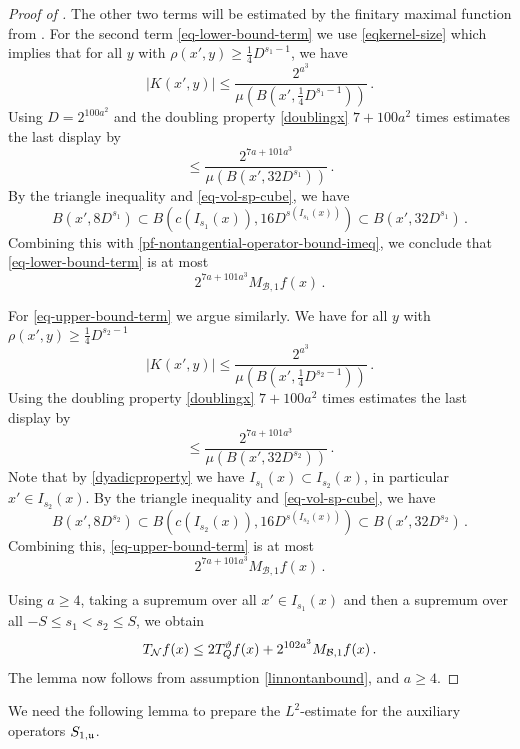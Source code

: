 \begin{proof}[Proof of ]
    The other two terms will be estimated by the finitary maximal function from .
    For the second term \eqref{eq-lower-bound-term} we use \eqref{eqkernel-size} which implies that for all $y$ with $\rho(x', y) \ge \frac{1}{4}D^{s_1 - 1}$, we have
    $$
        |K(x', y)| \le \frac{2^{a^3}}{\mu(B(x', \frac{1}{4}D^{s_1 - 1}))}\,.
    $$
    Using $D=2^{100a^2}$
    and the doubling property \eqref{doublingx} $7 +100a^2$ times estimates
    the last display by
    \begin{equation}
    \label{pf-nontangential-operator-bound-imeq}
        \le \frac{2^{7a+101a^3}}{\mu(B(x', 32D^{s_1}))}\, .
    \end{equation}
    By the triangle inequality and \eqref{eq-vol-sp-cube}, we have
    $$
        B(x', 8D^{s_1}) \subset B(c(I_{s_1}(x)), 16D^{s(I_{s_1}(x))}) \subset B(x', 32D^{s_1})\,.
    $$
    Combining this with \eqref{pf-nontangential-operator-bound-imeq}, we conclude that \eqref{eq-lower-bound-term} is at most
    $$
        2^{7a + 101a^3} M_{\mathcal{B},1} f(x)\,.
    $$

    For \eqref{eq-upper-bound-term} we argue similarly. We have for all $y$ with $\rho(x', y) \ge \frac{1}{4}D^{s_2-1}$
    $$
        |K(x', y)| \le \frac{2^{a^3}}{\mu(B(x', \frac{1}{4}D^{s_2-1}))}\,.
    $$
    Using the doubling property \eqref{doublingx} $7 + 100a^2$ times estimates
    the last display by
    \begin{equation}
        \le \frac{2^{7a + 101a^3}}{\mu(B(x', 32 D^{s_2}))}\, .
    \end{equation}
    Note that by \eqref{dyadicproperty} we have $I_{s_1}(x) \subset I_{s_2}(x)$, in particular $x' \in I_{s_2}(x)$.
    By the triangle inequality and \eqref{eq-vol-sp-cube}, we have
    $$
        B(x', 8D^{s_2}) \subset B(c(I_{s_2}(x)), 16D^{s(I_{s_2}(x))}) \subset B(x', 32D^{s_2})\,.
    $$
    Combining this, \eqref{eq-upper-bound-term} is at most
    $$
        2^{7a+101a^3} M_{\mathcal{B},1} f(x)\,.
    $$

    Using $a \ge 4$, taking a supremum over all $x' \in I_{s_1}(x)$ and then a supremum over all $-S \le s_1 < s_2 \le S$, we obtain
    $$
        T_{\mathcal{N}} f(x) \le 2T_{{Q}}^{\vartheta} f(x) + 2^{102a^3} M_{\mathcal{B},1} f(x)\,.
    $$
    The lemma now follows from assumption \eqref{linnontanbound},  and $a \ge 4$.
\end{proof}

We need the following lemma to prepare the $L^2$-estimate for the auxiliary operators $S_{1, {\mathfrak u}}$.

